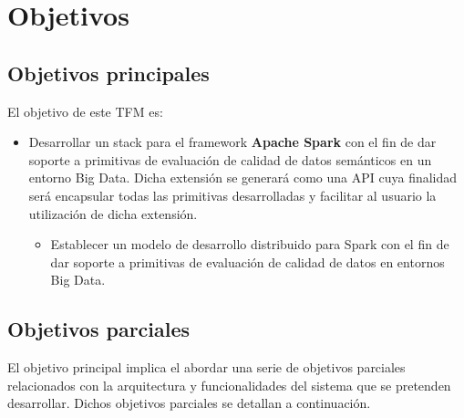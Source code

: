 \chapter{Objetivos}
\label{chap:objetivos}

\section{Objetivos principales}

El objetivo de este \acf{TFM} es:

\begin{itemize}
\item Desarrollar un stack para el framework \textbf{Apache Spark} con el fin de dar soporte a primitivas de evaluación de
  calidad de datos semánticos en un entorno Big Data. Dicha extensión se generará como una \acs{API} cuya finalidad será encapsular todas
las primitivas desarrolladas y facilitar al usuario la utilización de dicha
extensión.

\begin{itemize}
\item Establecer un modelo de
  desarrollo distribuido para Spark con el fin de dar soporte
  a primitivas de evaluación de calidad de datos en entornos Big Data.
\end{itemize}

\end{itemize}

\section{Objetivos parciales}

El objetivo principal implica el abordar una serie de objetivos parciales
relacionados con la arquitectura y funcionalidades del sistema que se pretenden
desarrollar. Dichos objetivos parciales se detallan a continuación. 


